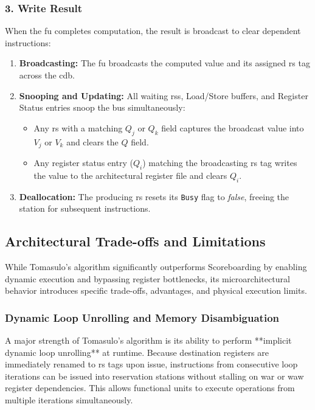 \subsubsection{3. Write Result}
When the \gls{fu} completes computation, the result is broadcast to clear dependent instructions:
\begin{enumerate}
    \item \textbf{Broadcasting:} The \gls{fu} broadcasts the computed value and its assigned \gls{rs} tag across the \gls{cdb}.
    \item \textbf{Snooping and Updating:} All waiting \glspl{rs}, Load/Store buffers, and Register Status entries snoop the bus simultaneously:
    \begin{itemize}
        \item Any \gls{rs} with a matching $Q_j$ or $Q_k$ field captures the broadcast value into $V_j$ or $V_k$ and clears the $Q$ field.
        \item Any register status entry ($Q_i$) matching the broadcasting \gls{rs} tag writes the value to the architectural register file and clears $Q_i$.
    \end{itemize}
    \item \textbf{Deallocation:} The producing \gls{rs} resets its \texttt{Busy} flag to \textit{false}, freeing the station for subsequent instructions.
\end{enumerate}


\subsection{Architectural Trade-offs and Limitations}
\label{subsec:tomasulo_tradeoffs}

While Tomasulo's algorithm significantly outperforms Scoreboarding by enabling dynamic execution and bypassing register bottlenecks, its microarchitectural behavior introduces specific trade-offs, advantages, and physical execution limits.

\subsubsection{Dynamic Loop Unrolling and Memory Disambiguation}
A major strength of Tomasulo's algorithm is its ability to perform **implicit dynamic loop unrolling** at runtime. Because destination registers are immediately renamed to \gls{rs} tags upon issue, instructions from consecutive loop iterations can be issued into reservation stations without stalling on \gls{war} or \gls{waw} register dependencies. This allows functional units to execute operations from multiple iterations simultaneously.

